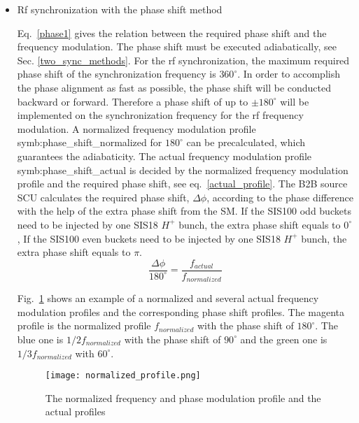 \begin{itemize}
\item Rf synchronization with the phase shift method

 
Eq.~\ref{phase1} gives the relation between the required phase shift and the frequency modulation. The phase shift must be executed adiabatically, see Sec. \ref{two_sync_methods}. For the rf synchronization, the maximum required phase shift of the synchronization frequency is $360^\circ$. In order to accomplish the phase alignment as fast as possible, the phase shift will be conducted backward or forward. Therefore a phase shift of up to $\pm 180^\circ$ will be implemented on the synchronization frequency for the rf frequency modulation. A normalized frequency modulation profile \gls{symb:phase_shift_normalized} for $180^\circ$ can be precalculated, which guarantees the adiabaticity. The actual frequency modulation profile \gls{symb:phase_shift_actual} is decided by the normalized frequency modulation profile and the required phase shift, see eq.~\ref{actual_profile}. The B2B source SCU calculates the required phase shift, $\Delta \phi$, according to the phase difference with the help of the extra phase shift from the SM. If the SIS100 odd buckets need to be injected by one SIS18 $H^+$ bunch, the extra phase shift equals to $0^\circ$, If the SIS100 even buckets need to be injected by one SIS18 $H^+$ bunch, the extra phase shift equals to $\pi$. 
\begin{equation}
\frac{\Delta \phi}{180^\circ}= \frac{f_{\mathit{actual}}}{f_{\mathit{normalized}}} \label{actual_profile}
\end{equation}

Fig.~\ref{normalized_profile} shows an example of a normalized and several actual frequency  modulation profiles and the corresponding phase shift profiles. The magenta profile is the normalized profile $f_{normalized}$ with the phase shift of $180^\circ$. The blue one is $1/2 f_{\mathit{normalized}}$ with the phase shift of $90^\circ$ and the green one is $1/3 f_{\mathit{normalized}}$ with $60^\circ$. 
\begin{figure}[H]
   \centering   
   \texttt{[image: normalized\_profile.png]}
   \caption{The normalized frequency and phase modulation profile and the actual profiles}
   \label{normalized_profile}
\end{figure}  


\end{itemize}
